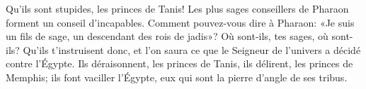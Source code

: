 Qu’ils sont stupides, les princes de Tanis!
	Les plus sages conseillers de Pharaon forment un conseil d’incapables.
Comment pouvez-vous dire à Pharaon:
	«Je suis un fils de sage, un descendant des rois de jadis»?
Où sont-ils, tes sages, où sont-ils?
	Qu’ils t’instruisent donc,
	et l’on saura ce que le Seigneur de l’univers a décidé contre l’Égypte.
Ils déraisonnent, les princes de Tanis, ils délirent, les princes de Memphis;
	ils font vaciller l’Égypte, eux qui sont la pierre d’angle de ses tribus.
